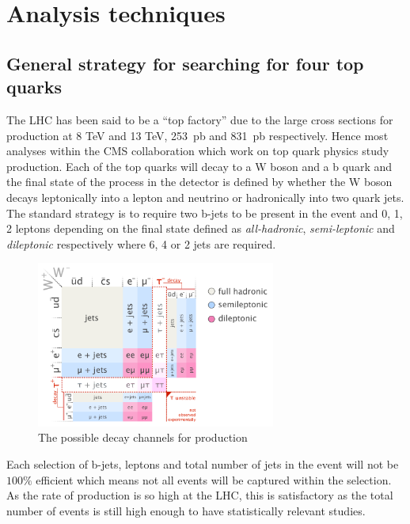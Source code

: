\chapter{Analysis techniques}

\section{General strategy for searching for four top quarks \label{sec:Strategy}}

The LHC has been said to be a ``top factory'' due to the large cross sections for \ttbar production at 8 TeV and 13 TeV, 253~pb and 831~pb respectively. Hence most analyses within the CMS collaboration which work on top quark physics study \ttbar production. Each of the top quarks will decay to a W boson and a b quark and the final state of the process in the detector is defined by whether the W boson decays leptonically into a lepton and neutrino or hadronically into two quark jets. The standard strategy is to require two b-jets to be present in the event and 0, 1, 2 leptons depending on the final state defined as \emph{all-hadronic}, \emph{semi-leptonic} and \emph{dileptonic} respectively where 6, 4 or 2 jets are required. 

\begin{figure}[ht!]
\centering
    \includegraphics[width=0.7\textwidth]{images/Analysis/Ttbar_decay_channels.png}
    \caption{The possible decay channels for \ttbar production}
    \label{fig:ttbarDecay}
\end{figure}

Each selection of b-jets, leptons and total number of jets in the event will not be $100\%$ efficient which means not all \ttbar events will be captured within the selection. As the rate of \ttbar production is so high at the LHC, this is satisfactory as the total number of events is still high enough to have statistically relevant studies.\\

